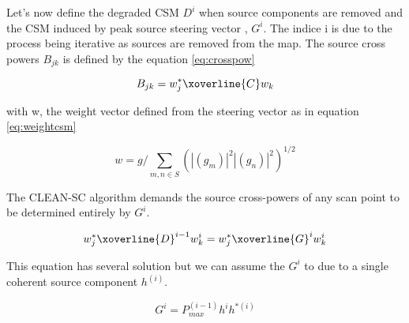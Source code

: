 Let's now define the degraded CSM  $D^{i}$ when source components are removed and the CSM induced by peak source steering vector , $G^{i}$. The indice i is due to the process being iterative as sources are removed from the map. The source cross powers $B_{jk}$ is defined by the equation \ref{eq:crosspow} 

\begin{equation}
    B_{jk}=w_{j}^{*}\xoverline{C}w_{k}
    \label{eq:crosspow}
\end{equation}

with w, the weight vector defined from the steering vector as in equation \ref{eq:weightcsm}

\begin{equation}
    w=g/\sum\limits_{m,n\in S}(|{(g_{m})}|^2|{(g_{n})}|^2)^{1/2}
    \label{eq:weightcsm}
\end{equation}

The CLEAN-SC algorithm demands the source cross-powers of any scan point to be determined entirely by $G^{i}$.

\begin{equation}
    w_{j}^{*}{\xoverline{D}}^{i-1}w^{i}_{k}=w_{j}^{*}\xoverline{G}^{i}w^{i}_{k} 
\end{equation}

This equation has several solution but we can assume the $G^{i}$ to due to a single coherent source component $h^{(i)}$. 

\begin{equation}
    G^{i}=P_{max}^{(i-1)}h^{i}h^{*(i)}
\end{equation}


